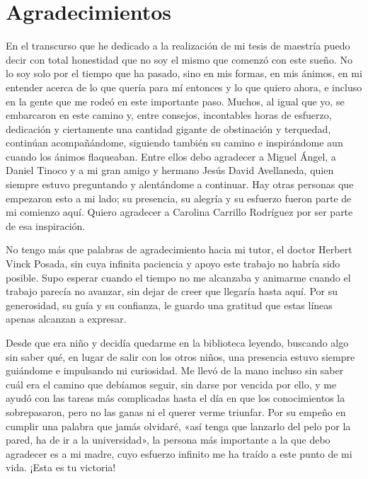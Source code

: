 \cleardoublepage %
\thispagestyle{empty}

\chapter*{Agradecimientos}

En el transcurso que he dedicado a la realización de mi tesis de maestría puedo decir con
total honestidad que no soy el mismo que comenzó con este sueño. No lo soy solo por el
tiempo que ha pasado, sino en mis formas, en mis ánimos, en mi entender acerca de lo que
quería para mí entonces y lo que quiero ahora, e incluso en la gente que me rodeó en este
importante paso. Muchos, al igual que yo, se embarcaron en este camino y, entre consejos,
incontables horas de esfuerzo, dedicación y ciertamente una cantidad gigante de obstinación
y terquedad, continúan acompañándome, siguiendo también su camino e inspirándome aun cuando
los ánimos flaqueaban. Entre ellos debo agradecer a Miguel Ángel, a Daniel Tinoco y a mi
gran amigo y hermano Jesús David Avellaneda, quien siempre estuvo preguntando y alentándome
a continuar. Hay otras personas que empezaron esto a mi lado; su presencia, su alegría y su
esfuerzo fueron parte de mi comienzo aquí. Quiero agradecer a Carolina Carrillo Rodríguez
por ser parte de esa inspiración.

No tengo más que palabras de agradecimiento hacia mi tutor, el doctor Herbert Vinck Posada,
sin cuya infinita paciencia y apoyo este trabajo no habría sido posible. Supo esperar
cuando el tiempo no me alcanzaba y animarme cuando el trabajo parecía no avanzar, sin dejar
de creer que llegaría hasta aquí. Por su generosidad, su guía y su confianza, le guardo una
gratitud que estas líneas apenas alcanzan a expresar.

Desde que era niño y decidía quedarme en la biblioteca leyendo, buscando algo sin saber qué,
en lugar de salir con los otros niños, una presencia estuvo siempre guiándome e impulsando
mi curiosidad. Me llevó de la mano incluso sin saber cuál era el camino que debíamos seguir,
sin darse por vencida por ello, y me ayudó con las tareas más complicadas hasta el día en que
los conocimientos la sobrepasaron, pero no las ganas ni el querer verme triunfar. Por su
empeño en cumplir una palabra que jamás olvidaré, «así tenga que lanzarlo del pelo por la
pared, ha de ir a la universidad», la persona más importante a la que debo agradecer es a mi
madre, cuyo esfuerzo infinito me ha traído a este punto de mi vida. ¡Esta es tu victoria!
